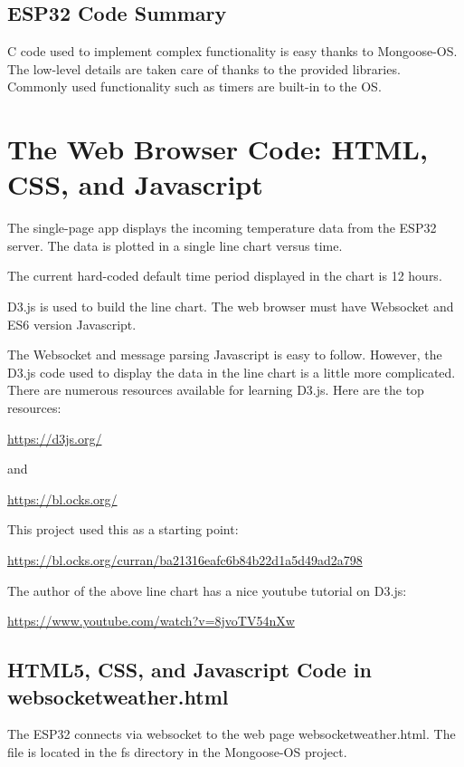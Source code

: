 \documentclass[oneside,letterpaper,12pt]{book}
\begin{document}
\section{ESP32 Code Summary}\label{esp32-code-summary}

C code used to implement complex functionality is easy thanks to
Mongoose-OS. The low-level details are taken care of thanks to the
provided libraries. Commonly used functionality such as timers are
built-in to the OS.

\chapter{The Web Browser Code: HTML, CSS, and
Javascript}\label{the-web-browser-code-html-css-and-javascript}

The single-page app displays the incoming temperature data from the
ESP32 server. The data is plotted in a single line chart versus time.

The current hard-coded default time period displayed in the chart is 12
hours.

D3.js is used to build the line chart. The web browser must have
Websocket and ES6 version Javascript.

The Websocket and message parsing Javascript is easy to follow. However,
the D3.js code used to display the data in the line chart is a little
more complicated. There are numerous resources available for learning
D3.js. Here are the top resources:

\url{https://d3js.org/}

and

\url{https://bl.ocks.org/}

This project used this as a starting point:

\url{https://bl.ocks.org/curran/ba21316eafc6b84b22d1a5d49ad2a798}

The author of the above line chart has a nice youtube tutorial on D3.js:

\url{https://www.youtube.com/watch?v=8jvoTV54nXw}

\section{HTML5, CSS, and Javascript Code in
websocketweather.html}\label{html5-css-and-javascript-code-in-websocketweather.html}

The ESP32 connects via websocket to the web page websocketweather.html.
The file is located in the fs directory in the Mongoose-OS project.
\end{document}

